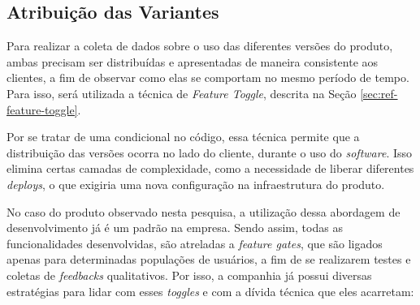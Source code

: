 \subsection{Atribuição das Variantes}

Para realizar a coleta de dados sobre o uso das diferentes versões do produto, ambas precisam ser distribuídas e apresentadas de maneira consistente aos clientes, a fim de observar como elas se comportam no mesmo período de tempo. Para isso, será utilizada a técnica de \textit{Feature Toggle}, descrita na Seção \ref{sec:ref-feature-toggle}.

Por se tratar de uma condicional no código, essa técnica permite que a distribuição das versões ocorra no lado do cliente, durante o uso do \textit{software}. Isso elimina certas camadas de complexidade, como a necessidade de liberar diferentes \textit{deploys}, o que exigiria uma nova configuração na infraestrutura do produto.

No caso do produto observado nesta pesquisa, a utilização dessa abordagem de desenvolvimento já é um padrão na empresa. Sendo assim, todas as funcionalidades desenvolvidas, são atreladas a \textit{feature gates}, que são ligados apenas para determinadas populações de usuários, a fim de se realizarem testes e coletas de \textit{feedbacks} qualitativos. Por isso, a companhia já possui diversas estratégias para lidar com esses \textit{toggles} e com a dívida técnica que eles acarretam:

